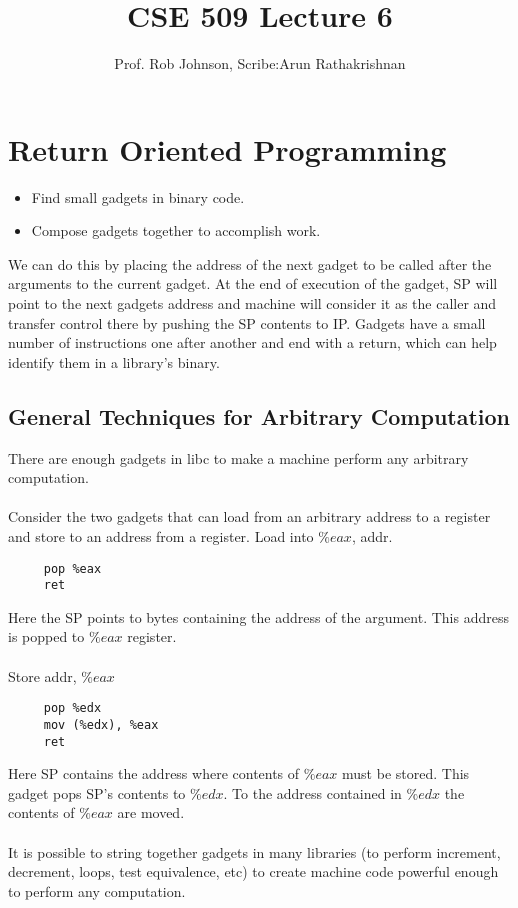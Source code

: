 \documentclass[11pt]{article} %
\title{CSE 509 Lecture 6}
\author{Prof. Rob Johnson, Scribe:Arun Rathakrishnan}
\begin{document}
\maketitle

\section{Return Oriented Programming}
\begin {itemize} \itemsep -2pt
\item Find small gadgets in binary code. 
\item Compose gadgets together to accomplish work. 
\end {itemize}

We can do this by placing the address of the next gadget to be called after the
arguments to the current gadget. At the end of execution of the gadget, SP will
point to the next gadgets address and machine will consider it as the caller
and transfer control there by pushing the SP contents to IP. Gadgets have a small
number of instructions one after another and end with a return, which can help
identify them in a library's binary.

\subsection{General Techniques for Arbitrary Computation}
There are enough gadgets in libc to make a machine perform any arbitrary
computation.\\
\\Consider the two gadgets that can load from an arbitrary address to a register
and store to an address from a register.
Load into $\%eax$, addr.
\begin{verbatim}
     pop %eax
     ret
\end{verbatim}
Here the SP points to bytes containing the address of the argument. This address
is popped  to $\%eax$ register.\\
\\
Store addr, $\%eax$
\begin{verbatim}
     pop %edx
     mov (%edx), %eax
     ret
\end{verbatim}
Here SP contains the address where contents of $\%eax$ must be stored. This
gadget pops SP's contents to $\%edx$. To the address contained in $\%edx$ the
contents of $\%eax$ are moved.\\
\\
It is possible to string together gadgets in many libraries (to perform increment, decrement, loops,
test equivalence, etc) to create machine code powerful enough to perform any computation.
\end{document}
